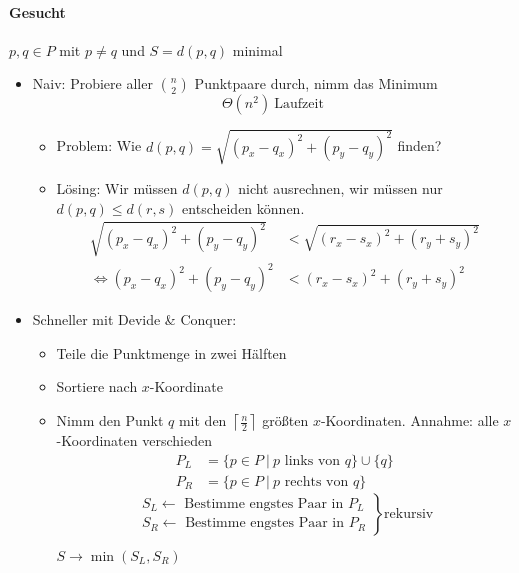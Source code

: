 \paragraph*{Gesucht} $p, q \in P$ mit $p \neq q$ und $S = d(p,q)$ minimal
\begin{itemize}
 \item Naiv: Probiere aller $\binom{n}{2}$ Punktpaare durch, nimm das Minimum
         \[\Theta(n^2)\ \text{Laufzeit}\]
        \begin{itemize}
         \item Problem: Wie $d(p,q) = \sqrt{(p_x - q_x)^2 + (p_y - q_y)^2}$ finden?
         \item Lösing: Wir müssen $d(p,q)$ nicht ausrechnen, wir müssen nur $d(p,q) \leq d(r,s)$ entscheiden können.
                \begin{align*}
                 \sqrt{(p_x - q_x)^2 + (p_y - q_y)^2} &< \sqrt{(r_x - s_x)^2 + (r_y + s_y)^2} \\
                 \Leftrightarrow (p_x - q_x)^2 + (p_y - q_y)^2 &< (r_x - s_x)^2 + (r_y + s_y)^2
                \end{align*}
        \end{itemize}
 \item Schneller mit Devide \& Conquer:
         \begin{itemize}
          \item  Teile die Punktmenge in zwei Hälften
          \item  Sortiere nach $x$-Koordinate
          \item  Nimm den Punkt $q$ mit den $\left\lceil\frac{n}{2}\right\rceil$ größten $x$-Koordinaten. Annahme: alle $x$-Koordinaten verschieden
              \begin{align*}
               P_L &= \{p \in P\ |\ \text{$p$ links von $q$}\} \cup \{q\}\\
               P_R &= \{p \in P\ |\ \text{$p$ rechts von $q$}\}
              \end{align*}
              \[
                  \left.\begin{matrix}
                   \text{$S_L \leftarrow$ Bestimme engstes Paar in $P_L$} \\
                   \text{$S_R \leftarrow$ Bestimme engstes Paar in $P_R$}
                  \end{matrix}
                 \right\}\text{rekursiv}
              \]
              \begin{center}
                $S \to \min(S_L, S_R)$
              \end{center}

\end{itemize}
\end{itemize}
